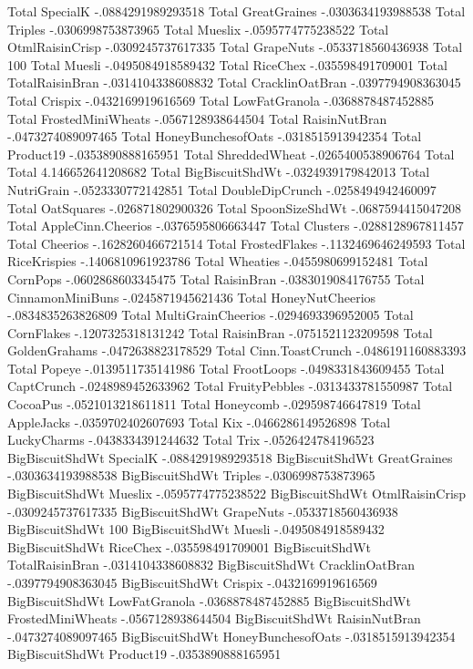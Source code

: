 Total	SpecialK	-.0884291989293518
Total	GreatGraines	-.0303634193988538
Total	Triples	-.0306998753873965
Total	Mueslix	-.0595774775238522
Total	OtmlRaisinCrisp	-.0309245737617335
Total	GrapeNuts	-.0533718560436938
Total	100%
Total	Muesli	-.0495084918589432
Total	RiceChex	-.035598491709001
Total	TotalRaisinBran	-.0314104338608832
Total	CracklinOatBran	-.0397794908363045
Total	Crispix	-.0432169919616569
Total	LowFatGranola	-.0368878487452885
Total	FrostedMiniWheats	-.0567128938644504
Total	RaisinNutBran	-.0473274089097465
Total	HoneyBunchesofOats	-.0318515913942354
Total	Product19	-.0353890888165951
Total	ShreddedWheat	-.0265400538906764
Total	Total	4.146652641208682
Total	BigBiscuitShdWt	-.0324939179842013
Total	NutriGrain	-.0523330772142851
Total	DoubleDipCrunch	-.0258494942460097
Total	OatSquares	-.026871802900326
Total	SpoonSizeShdWt	-.0687594415047208
Total	AppleCinn.Cheerios	-.0376595806663447
Total	Clusters	-.0288128967811457
Total	Cheerios	-.1628260466721514
Total	FrostedFlakes	-.1132469646249593
Total	RiceKrispies	-.1406810961923786
Total	Wheaties	-.0455980699152481
Total	CornPops	-.0602868603345475
Total	RaisinBran	-.0383019084176755
Total	CinnamonMiniBuns	-.0245871945621436
Total	HoneyNutCheerios	-.0834835263826809
Total	MultiGrainCheerios	-.0294693396952005
Total	CornFlakes	-.1207325318131242
Total	RaisinBran	-.0751521123209598
Total	GoldenGrahams	-.0472638823178529
Total	Cinn.ToastCrunch	-.0486191160883393
Total	Popeye	-.0139511735141986
Total	FrootLoops	-.0498331843609455
Total	CaptCrunch	-.0248989452633962
Total	FruityPebbles	-.0313433781550987
Total	CocoaPus	-.0521013218611811
Total	Honeycomb	-.029598746647819
Total	AppleJacks	-.0359702402607693
Total	Kix	-.0466286149526898
Total	LuckyCharms	-.0438334391244632
Total	Trix	-.0526424784196523
BigBiscuitShdWt	SpecialK	-.0884291989293518
BigBiscuitShdWt	GreatGraines	-.0303634193988538
BigBiscuitShdWt	Triples	-.0306998753873965
BigBiscuitShdWt	Mueslix	-.0595774775238522
BigBiscuitShdWt	OtmlRaisinCrisp	-.0309245737617335
BigBiscuitShdWt	GrapeNuts	-.0533718560436938
BigBiscuitShdWt	100%
BigBiscuitShdWt	Muesli	-.0495084918589432
BigBiscuitShdWt	RiceChex	-.035598491709001
BigBiscuitShdWt	TotalRaisinBran	-.0314104338608832
BigBiscuitShdWt	CracklinOatBran	-.0397794908363045
BigBiscuitShdWt	Crispix	-.0432169919616569
BigBiscuitShdWt	LowFatGranola	-.0368878487452885
BigBiscuitShdWt	FrostedMiniWheats	-.0567128938644504
BigBiscuitShdWt	RaisinNutBran	-.0473274089097465
BigBiscuitShdWt	HoneyBunchesofOats	-.0318515913942354
BigBiscuitShdWt	Product19	-.0353890888165951
